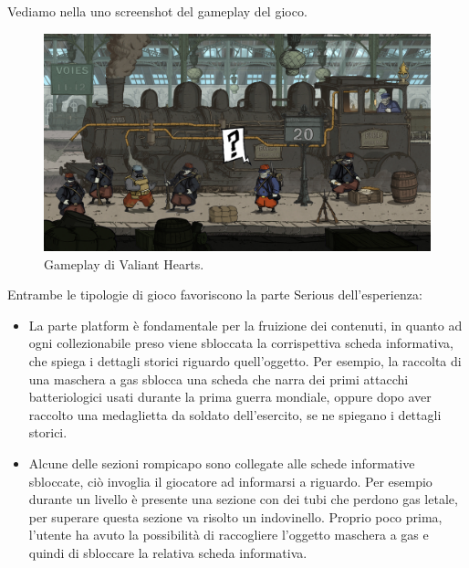 Vediamo nella \myfig{\ref{fig:vhgameplay}} uno screenshot del gameplay del gioco. 

\begin{figure}[h]
\centerline{\includegraphics[scale=0.17]{images/statoarte/vhgameplay.jpg}}
\caption{Gameplay di Valiant Hearts.}
\label{fig:vhgameplay}
\end{figure}

Entrambe le tipologie di gioco favoriscono la parte Serious dell'esperienza:

\begin{itemize}
\item La parte platform è fondamentale per la fruizione dei contenuti, in quanto ad ogni collezionabile preso viene sbloccata la corrispettiva scheda informativa, che spiega i dettagli storici riguardo quell'oggetto. Per esempio, la raccolta di una maschera a gas sblocca una scheda che narra dei primi attacchi batteriologici usati durante la prima guerra mondiale, oppure dopo aver raccolto una medaglietta da soldato dell'esercito, se ne spiegano i dettagli storici.
\item Alcune delle sezioni rompicapo sono collegate alle schede informative sbloccate, ciò invoglia il giocatore ad informarsi a riguardo. Per esempio durante un livello è presente una sezione con dei tubi che perdono gas letale, per superare questa sezione va risolto un indovinello. Proprio poco prima, l'utente ha avuto la possibilità di raccogliere l'oggetto maschera a gas e quindi di sbloccare la relativa scheda informativa.
\end{itemize}

